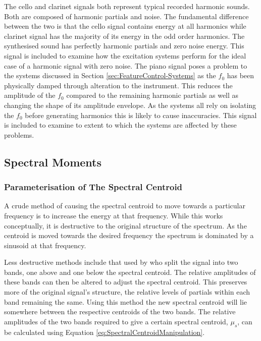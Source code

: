 	The cello and clarinet signals both represent typical recorded harmonic sounds. Both are composed of harmonic
	partials and noise. The fundamental difference between the two is that the cello signal contains energy at all
	harmonics while clarinet signal has the majority of its energy in the odd order harmonics. The synthesised sound
	has perfectly harmonic partials and zero noise energy. This signal is included to examine how the excitation
	systems perform for the ideal case of a harmonic signal with zero noise. The piano signal poses a problem to the
	systems discussed in Section \ref{sec:FeatureControl-Systems} as the $f_{0}$ has been physically damped through
	alteration to the instrument. This reduces the amplitude of the $f_{0}$ compared to the remaining harmonic partials
	as well as changing the shape of its amplitude envelope. As the systems all rely on isolating the $f_{0}$ before
	generating harmonics this is likely to cause inaccuracies. This signal is included to examine to extent to which
	the systems are affected by these problems.

	\subsection{Spectral Moments}
	\label{sec:FeatureControl-Parameterisation-SpectralMoments}
		\subsubsection*{Parameterisation of The Spectral Centroid}
			A crude method of causing the spectral centroid to move towards a particular frequency is to
			increase the energy at that frequency. While this works conceptually, it is destructive to the
			original structure of the spectrum. As the centroid is moved towards the desired frequency the
			spectrum is dominated by a sinusoid at that frequency.

			Less destructive methods include that used by \citet{zacharakis2011an} who split the signal into
			two bands, one above and one below the spectral centroid. The relative amplitudes of these bands
			can then be altered to adjust the spectral centroid. This preserves more of the original signal's
			structure, the relative levels of partials within each band remaining the same. Using this method
			the new spectral centroid will lie somewhere between the respective centroids of the two bands. The
			relative amplitudes of the two bands required to give a certain spectral centroid, $\mu_{s}$, can
			be calculated using Equation \ref{eq:SpectralCentroidManipulation}.

